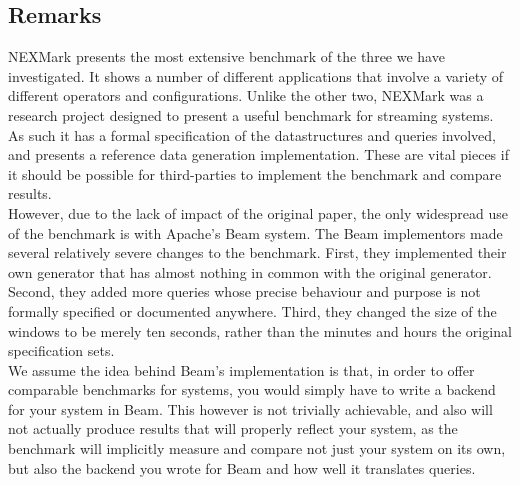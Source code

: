 \subsection{Remarks}\label{section:nexmark-remarks}
NEXMark presents the most extensive benchmark of the three we have investigated. It shows a number of different applications that involve a variety of different operators and configurations. Unlike the other two, NEXMark was a research project designed to present a useful benchmark for streaming systems. As such it has a formal specification of the datastructures and queries involved, and presents a reference data generation implementation. These are vital pieces if it should be possible for third-parties to implement the benchmark and compare results. \\

However, due to the lack of impact of the original paper, the only widespread use of the benchmark is with Apache's Beam system. The Beam implementors made several relatively severe changes to the benchmark. First, they implemented their own generator that has almost nothing in common with the original generator. Second, they added more queries whose precise behaviour and purpose is not formally specified or documented anywhere. Third, they changed the size of the windows to be merely ten seconds, rather than the minutes and hours the original specification sets. \\

We assume the idea behind Beam's implementation is that, in order to offer comparable benchmarks for systems, you would simply have to write a backend for your system in Beam. This however is not trivially achievable, and also will not actually produce results that will properly reflect your system, as the benchmark will implicitly measure and compare not just your system on its own, but also the backend you wrote for Beam and how well it translates queries. \\

